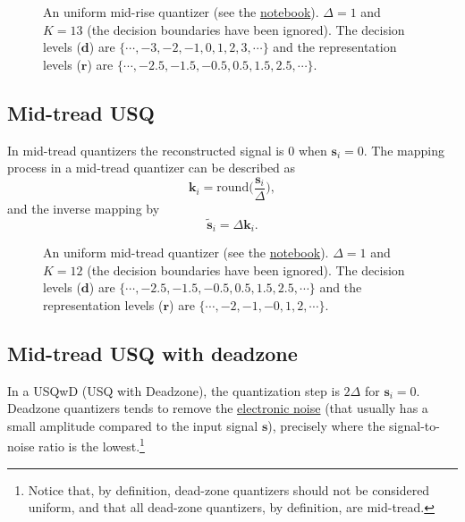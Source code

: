 \begin{figure}
  \caption{An uniform mid-rise quantizer (see the
    \href{https://nbviewer.jupyter.org/github/vicente-gonzalez-ruiz/scalar_quantization/blob/master/graphics/midrise.ipynb}{notebook}). $\Delta=1$
    and $K=13$ (the decision boundaries have been ignored). The
    decision levels (${\mathbf d}$) are $\{\cdots,-3,-2,-1,0,1,2,3,\cdots\}$
    and the representation levels (${\mathbf r}$) are
    $\{\cdots,-2.5,-1.5,-0.5,0.5,1.5,2.5,\cdots\}$.}
  \label{fig:midrise}
\end{figure}

\subsection{Mid-tread USQ}

In mid-tread quantizers the reconstructed signal is $0$ when ${\mathbf
  s}_i=0$. The mapping process in a mid-tread quantizer can be described as
\begin{equation}
  {\mathbf k}_i = \mathrm{round}\Big( \frac{{\mathbf s}_i}{\Delta} \Big),
  \label{eq:midrise}
\end{equation}
and the inverse mapping by
\begin{equation}
  \tilde{\mathbf s}_i = \Delta{\mathbf k}_i.
  \label{eq:inverse_midrise}
\end{equation}

\begin{figure}
  \caption{An uniform mid-tread quantizer (see the
    \href{https://nbviewer.jupyter.org/github/vicente-gonzalez-ruiz/scalar_quantization/blob/master/graphics/midtread.ipynb}{notebook}). $\Delta=1$
    and $K=12$ (the decision boundaries have been ignored). The
    decision levels (${\mathbf d}$) are $\{\cdots,-2.5,-1.5,-0.5,0.5,1.5,2.5,\cdots\}$
    and the representation levels (${\mathbf r}$) are
    $\{\cdots,-2,-1,-0,1,2,\cdots\}$.}
  \label{fig:midtread}
\end{figure}

\subsection{Mid-tread USQ with deadzone}

In a USQwD (USQ with Deadzone), the quantization step is $2\Delta$ for
${\mathbf s}_i=0$. Deadzone quantizers tends to remove the
\href{https://en.wikipedia.org/wiki/Noise_(electronics)}{electronic
  noise} (that usually has a small amplitude compared to the input
signal ${\mathbf s}$), precisely where the signal-to-noise ratio is
the lowest.\footnote{Notice that, by definition, dead-zone quantizers
should not be considered uniform, and that all dead-zone quantizers,
by definition, are mid-tread.}

